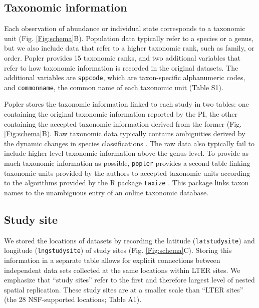 \documentclass{article}\usepackage[]{graphicx}\usepackage[]{color}
\begin{document}
\subsection*{Taxonomic information}
Each observation of abundance or individual state corresponds to a taxonomic unit (Fig. \ref{Fig:schema}B). Population data typically refer to a species or a genus, but we also include data that refer to a higher taxonomic rank, such as family, or order. %
Popler provides 15 taxonomic ranks, and two additional variables that refer to how taxonomic information is recorded in the original datasets. The additional variables are \texttt{sppcode}, which are taxon-specific alphanumeric codes, and \texttt{common\textunderscore name}, the common name of each taxonomic unit (Table S1).

Popler stores the taxonomic information linked to each study in two tables: one containing the original taxonomic information reported by the PI, the other containing the accepted taxonomic information derived from the former (Fig. \ref{Fig:schema}B). Raw taxonomic data typically contains ambiguities derived by the dynamic changes in species classifications \citep{Chamberlain2013}. The raw data also typically fail to include higher-level taxonomic information above the genus level. To provide as much taxonomic information as possible, \texttt{popler} provides a second table linking taxonomic units provided by the authors to accepted taxonomic units according to the algorithms provided by the R package \texttt{taxize} \citep{Chamberlain2013}. This package links taxon names to the unambiguous entry of an online taxonomic database.

\subsection*{Study site}
We stored the locations of datasets by recording the latitude (\texttt{lat\textunderscore study\textunderscore site}) and longitude (\texttt{lng\textunderscore study\textunderscore site}) of study sites (Fig. \ref{Fig:schema}C). Storing this information in a separate table allows for explicit connections between independent data sets collected at the same locations within LTER sites. We emphasize that ``study sites'' refer to the first and therefore largest level of nested spatial replication. These study sites are at a smaller scale than ``LTER sites'' (the 28 NSF-supported locations; Table A1).
\end{document}
